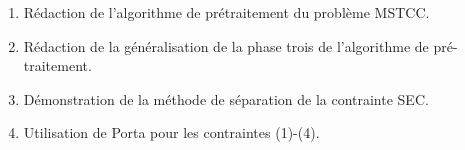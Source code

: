 \begin{enumerate}
    \item Rédaction de l'algorithme de prétraitement du problème MSTCC.
    \item Rédaction de la généralisation de la phase trois de l'algorithme de pré-traitement.
    \item Démonstration de la méthode de séparation de la contrainte SEC.
    \item Utilisation de Porta pour les contraintes (1)-(4). 
    
\end{enumerate}